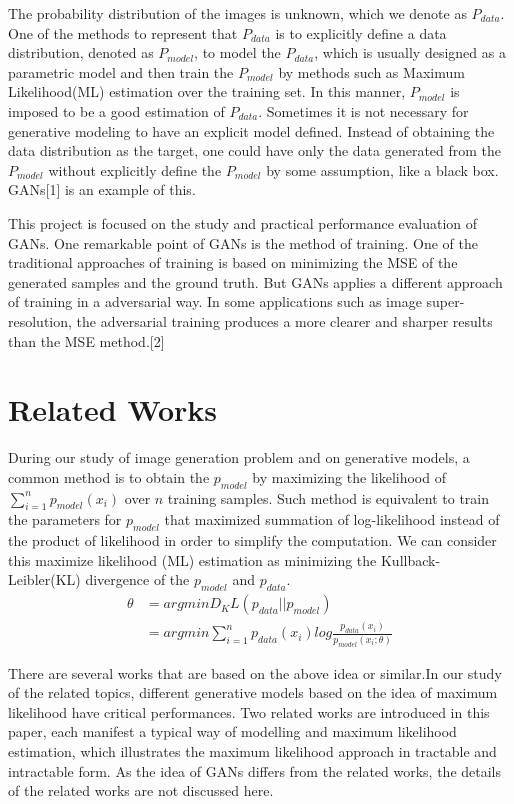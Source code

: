 \documentclass[10pt,twocolumn,letterpaper]{article}
\begin{document}
The probability distribution of the images is unknown, which we denote as $P_{data}$. One of the methods to represent that $P_{data}$ is to explicitly define a data distribution, denoted as $P_{model}$, to model the $P_{data}$, which is usually designed as a parametric model and then train the $P_{model}$ by methods such as Maximum Likelihood(ML) estimation over the training set. In this manner, $P_{model}$ is imposed to be a good estimation of $P_{data}$. Sometimes it is not necessary for generative modeling to have an explicit model defined. Instead of obtaining the data distribution as the target, one could have only the data generated from the $P_{model}$ without explicitly define the $P_{model}$ by some assumption, like a black box. GANs[1] is an example of this.

This project is focused on the study and practical performance evaluation of GANs. One remarkable point of GANs is the method of training. One of the traditional approaches of training is based on minimizing the MSE of the generated samples and the ground truth. But GANs applies a different approach of training in a adversarial way. In some applications such as image super-resolution, the adversarial training produces a more clearer and sharper results than the MSE method.[2]






\section{Related Works}

During our study of image generation problem and on generative models, a common method is to obtain the $p_{model}$ by maximizing the likelihood of $\sum_{i=1}^{n}p_{model}(x_i)$ over $n$ training samples. Such method is equivalent to train the parameters for $p_{model}$ that maximized summation of log-likelihood instead of the product of likelihood in order to simplify the computation. We can consider this  maximize likelihood (ML) estimation as minimizing the Kullback-Leibler(KL) divergence of the $p_{model}$ and $p_{data}$.
\begin{align}
\theta &= argminD_KL(p_{data}||p_{model})\nonumber \\
&= argmin\sum_{i=1}^{n}p_{data}(x_i)log\frac{p_{data}(x_i)}{p_{model}(x_i;\theta)}
\end{align}

There are several works that are based on the above idea or similar.In our study of the related topics, different generative models based on the idea of maximum likelihood have critical performances. Two related works are introduced in this paper, each manifest a typical way of modelling and maximum likelihood estimation, which illustrates the maximum likelihood approach in tractable and intractable form. As the idea of GANs differs from the related works, the details of the related works are not discussed here.
\end{document}
